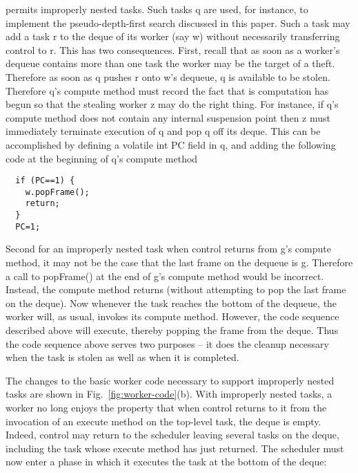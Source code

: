 \Xten{} permits improperly nested tasks. Such tasks q are used, for
instance, to implement the pseudo-depth-first search discussed in this
paper. Such a task may add a task r to the deque of its worker (say w)
without necessarily transferring control to r. This has two
consequences. First, recall that as soon as a worker's dequeue
contains more than one task the worker may be the target of a
theft. Therefore as soon as q pushes r onto w's dequeue, q is
available to be stolen.  Therefore q's compute method must record the
fact that is computation has begun so that the stealing worker z may
do the right thing. For instance, if q's compute method does not
contain any internal suspension point then z must immediately
terminate execution of q and pop q off its deque. This can be
accomplished by defining a volatile int PC field in q, and adding the
following code at the beginning of q's compute method

{\scriptsize
\begin{verbatim}
  if (PC==1) {
    w.popFrame();
    return;
  }
  PC=1;
\end{verbatim}
}

Second for an improperly nested task when control returns from g's
compute method, it may not be the case that the last frame on the
dequeue is g. Therefore a call to {\java popFrame()} at the end of
g's compute method would be incorrect. Instead, the compute method
returns (without attempting to pop the last frame on the deque). Now
whenever the task reaches the bottom of the dequeue, the worker will,
as usual, invokes its compute method. However, the code sequence
described above will execute, thereby popping the frame from the
deque. Thus the code sequence above serves two purposes -- it does the
cleanup necessary when the task is stolen as well as when it is
completed.

The changes to the basic worker code necessary to support improperly
nested tasks are shown in Fig.~\ref{fig:worker-code}(b). With
improperly nested tasks, a worker no long enjoys the property that
when control returns to it from the invocation of an execute method on
the top-level task, the deque is empty. Indeed, control may return to
the scheduler leaving several tasks on the deque, including the task
whose execute method has just returned. The scheduler must now enter a
phase in which it executes the task at the bottom of the deque:

